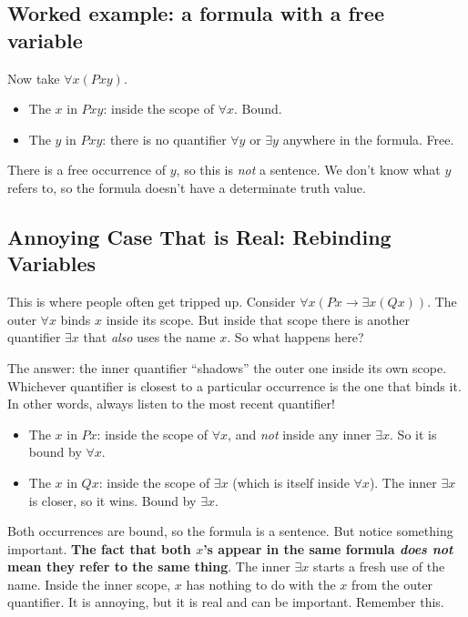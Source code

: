 \documentclass[11pt]{article}
\begin{document}
\subsection{Worked example: a formula with a free variable}

Now take $\forall x(Pxy)$.

\begin{itemize}[leftmargin=*]
    \item The $x$ in $Pxy$: inside the scope of $\forall x$. Bound.
    \item The $y$ in $Pxy$: there is no quantifier $\forall y$ or $\exists y$ anywhere in the formula. Free.
\end{itemize}

There is a free occurrence of $y$, so this is \emph{not} a sentence. We don't know what $y$ refers to, so the formula doesn't have a determinate truth value.

\subsection{\textbf{Annoying Case That is Real: }Rebinding Variables}

This is where people often get tripped up. Consider $\forall x(Px \to \exists x(Qx))$. The outer $\forall x$ binds $x$ inside its scope. But inside that scope there is another quantifier $\exists x$ that \emph{also} uses the name $x$. So what happens here?

The answer: the inner quantifier ``shadows'' the outer one inside its own scope. Whichever quantifier is closest to a particular occurrence is the one that binds it. In other words, always listen to the most recent quantifier!

\begin{itemize}[leftmargin=*]
    \item The $x$ in $Px$: inside the scope of $\forall x$, and \emph{not} inside any inner $\exists x$. So it is bound by $\forall x$.
    \item The $x$ in $Qx$: inside the scope of $\exists x$ (which is itself inside $\forall x$). The inner $\exists x$ is closer, so it wins. Bound by $\exists x$.
\end{itemize}

Both occurrences are bound, so the formula is a sentence. But notice something important. \textbf{The fact that both $x$'s appear in the same formula \emph{does not} mean they refer to the same thing}. The inner $\exists x$ starts a fresh use of the name. Inside the inner scope, $x$ has nothing to do with the $x$ from the outer quantifier. It is annoying, but it is real and can be important. Remember this.
\end{document}
